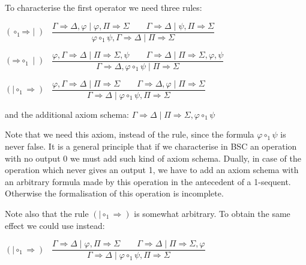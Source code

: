 \documentclass[10pt,a4paper]{article}
\theoremstyle{definition}
\newcommand{\3}{\vspace{.3in}}
\newcommand{\2}{\vspace{.2in}}
\newcommand{\1}{\vspace{.1in}}
\newcommand{\5}{\vspace{.05in}}
\begin{document}
To characterise the first operator we need three rules:

\begin{flushleft}
	$(\mathord{\circ_1}\mathord{\Rightarrow}\mid)$ \, $\dfrac{\Gamma
		\Rightarrow \Delta, \varphi \mid \varphi, \Pi\Rightarrow\Sigma \qquad \Gamma\Rightarrow\Delta \mid\psi,
		\Pi \Rightarrow \Sigma } {\varphi\circ_1\psi, \Gamma
		\Rightarrow \Delta \mid \Pi\Rightarrow\Sigma}$
\end{flushleft} 

\begin{flushleft}
	$(\mathord{\Rightarrow}\mathord{\circ_1}\mid)$ \, $\dfrac{\varphi, \Gamma
		\Rightarrow \Delta \mid \Pi\Rightarrow\Sigma, \psi \qquad\Gamma\Rightarrow\Delta \mid\Pi \Rightarrow \Sigma, \varphi, \psi} {\Gamma
		\Rightarrow \Delta, \varphi\circ_1\psi \mid \Pi\Rightarrow\Sigma}$
\end{flushleft} 

\begin{flushleft}
	$(\mathord{\mid\mathord{\circ_1}\Rightarrow})$ \, $\dfrac{\varphi, \Gamma
		\Rightarrow \Delta \mid \Pi\Rightarrow\Sigma \qquad\Gamma\Rightarrow\Delta, \varphi \mid\Pi \Rightarrow \Sigma} {\Gamma
		\Rightarrow \Delta\mid \varphi\circ_1\psi, \Pi\Rightarrow\Sigma}$
\end{flushleft} 


and the additional axiom schema: $\Gamma\Rightarrow\Delta\mid\Pi\Rightarrow\Sigma, \varphi\circ_1\psi$

\1

Note that we need this axiom, instead of the rule, since the formula $\varphi\circ_1\psi$ is never false. It is a general principle that if we characterise in BSC an operation with no output 0 we must add such kind of axiom schema. Dually, in case of the operation which never gives an output 1, we have to add an axiom schema with an arbitrary formula made by this operation in the antecedent of a 1-sequent.  Otherwise the formalisation of this operation is incomplete.

Note also that the rule $(\mathord{\mid\mathord{\circ_1}\Rightarrow})$ is somewhat arbitrary. To obtain the same effect we could use instead:

\begin{flushleft}
	$(\mathord{\mid\mathord{\circ_1}\Rightarrow})$ \, $\dfrac{\Gamma
		\Rightarrow \Delta \mid \varphi, \Pi\Rightarrow\Sigma \qquad\Gamma\Rightarrow\Delta\mid\Pi \Rightarrow \Sigma, \varphi} {\Gamma
		\Rightarrow \Delta\mid \varphi\circ_1\psi, \Pi\Rightarrow\Sigma}$
\end{flushleft} 
\end{document}
